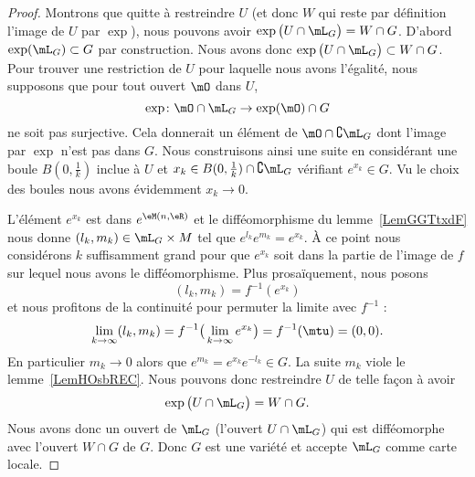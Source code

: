\begin{proof}
    Montrons que quitte à restreindre \( U\) (et donc \( W\) qui reste par définition l'image de \( U\) par \( \exp\)), nous pouvons avoir \( \exp\big( U\cap\mL_G \big)=W\cap G\). D'abord \( \exp(\mL_G)\subset G\) par construction. Nous avons donc \( \exp\big( U\cap\mL_G \big)\subset W\cap G\). Pour trouver une restriction de \( U\) pour laquelle nous avons l'égalité, nous supposons que pour tout ouvert \( \mO\) dans \( U\),
    \begin{equation}
        \exp\colon \mO\cap\mL_G\to \exp(\mO)\cap G
    \end{equation}
    ne soit pas surjective. Cela donnerait un élément de \( \mO\cap\complement\mL_G\) dont l'image par \( \exp\) n'est pas dans \( G\). Nous construisons ainsi une suite en considérant une boule \( B(0,\frac{1}{ k })\) inclue à \( U\) et \( x_k\in B(0,\frac{1}{ k })\cap\complement\mL_G\) vérifiant \(  e^{x_k}\in G\). Vu le choix des boules nous avons évidemment \( x_k\to 0\).

    L'élément \(  e^{x_k}\) est dans \(  e^{\eM(n,\eR)}\) et le difféomorphisme du lemme~\ref{LemGGTtxdF} nous donne \( (l_k,m_k)\in \mL_G\times M\) tel que \(  e^{l_k} e^{m_k}= e^{x_k}\). À ce point nous considérons \( k\) suffisamment grand pour que \(  e^{x_k}\) soit dans la partie de l'image de \( f\) sur lequel nous avons le difféomorphisme. Plus prosaïquement, nous posons
    \begin{equation}
        (l_k,m_k)=f^{-1}( e^{x_k})
    \end{equation}
    et nous profitons de la continuité pour permuter la limite avec \( f^{-1}\) :
    \begin{equation}
        \lim_{k\to \infty} (l_k,m_k)=f^{-1}\big( \lim_{k\to \infty}  e^{x_k} \big)=f^{-1}(\mtu)=(0,0).
    \end{equation}
    En particulier \( m_k\to 0\) alors que \(  e^{m_k}= e^{x_k} e^{-l_k}\in G\). La suite \( m_k\) viole le lemme~\ref{LemHOsbREC}. Nous pouvons donc restreindre \( U\) de telle façon à avoir
    \begin{equation}
        \exp\big( U\cap\mL_G \big)=W\cap G.
    \end{equation}
    Nous avons donc un ouvert de \( \mL_G\) (l'ouvert \( U\cap\mL_G\)) qui est difféomorphe avec l'ouvert \( W\cap G\) de \( G\). Donc \( G\) est une variété et accepte \( \mL_G\) comme carte locale.

\end{proof}

